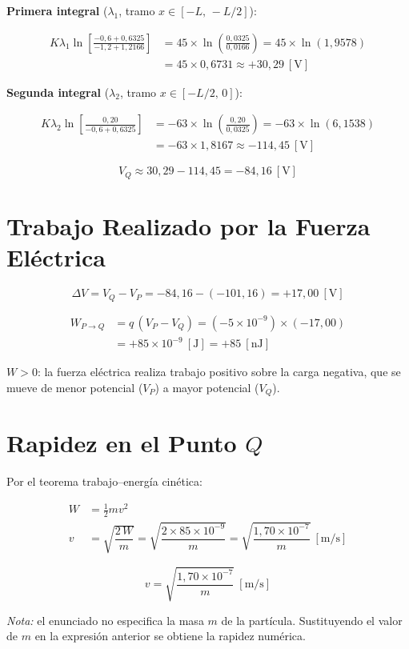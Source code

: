 \documentclass[12pt,letterpaper]{article}
\begin{document}
\noindent\textbf{Primera integral} ($\lambda_1$, tramo $x\in[-L,\,-L/2]$):

\begin{align*}
    K\lambda_1\ln\!\left[\frac{-0{,}6+0{,}6325}{-1{,}2+1{,}2166}\right]
        &= 45\times\ln\!\left(\frac{0{,}0325}{0{,}0166}\right)
         = 45\times\ln(1{,}9578)\\[4pt]
        &= 45\times 0{,}6731
         \approx +30{,}29\ [\text{V}]
\end{align*}

\noindent\textbf{Segunda integral} ($\lambda_2$, tramo $x\in[-L/2,\,0]$):

\begin{align*}
    K\lambda_2\ln\!\left[\frac{0{,}20}{-0{,}6+0{,}6325}\right]
        &= -63\times\ln\!\left(\frac{0{,}20}{0{,}0325}\right)
         = -63\times\ln(6{,}1538)\\[4pt]
        &= -63\times 1{,}8167
         \approx -114{,}45\ [\text{V}]
\end{align*}

\[
    \boxed{V_Q \approx 30{,}29 - 114{,}45 = -84{,}16\ [\text{V}]}
\]

\section*{Trabajo Realizado por la Fuerza El\'ectrica}

\[
    \Delta V = V_Q - V_P = -84{,}16 - (-101{,}16) = +17{,}00\ [\text{V}]
\]

\begin{align*}
    W_{P\to Q}
        &= q\,(V_P - V_Q)
         = (-5\times10^{-9})\times(-17{,}00)\\[4pt]
        &= +85\times10^{-9}\ [\text{J}]
         = +85\ [\text{nJ}]
\end{align*}

$W > 0$: la fuerza el\'ectrica realiza trabajo positivo sobre la carga negativa,
que se mueve de menor potencial ($V_P$) a mayor potencial ($V_Q$).

\section*{Rapidez en el Punto $Q$}

Por el teorema trabajo--energ\'ia cin\'etica:

\begin{align*}
    W &= \tfrac{1}{2}mv^2\\[6pt]
    v &= \sqrt{\dfrac{2\,W}{m}}
       = \sqrt{\dfrac{2\times85\times10^{-9}}{m}}
       = \sqrt{\dfrac{1{,}70\times10^{-7}}{m}}\ [\text{m/s}]
\end{align*}

\[
    \boxed{v = \sqrt{\dfrac{1{,}70\times10^{-7}}{m}}\ [\text{m/s}]}
\]

\textit{Nota:} el enunciado no especifica la masa $m$ de la part\'icula.
Sustituyendo el valor de $m$ en la expresi\'on anterior se obtiene la rapidez num\'erica.
\end{document}
